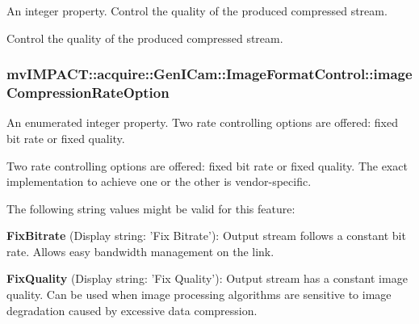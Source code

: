 An integer property. Control the quality of the produced compressed stream. 

Control the quality of the produced compressed stream. \hypertarget{classmv_i_m_p_a_c_t_1_1acquire_1_1_gen_i_cam_1_1_image_format_control_a22653a4407894a6665295887050343a2}{
\subsubsection[{image\+Compression\+Rate\+Option}]{ mv\+I\+M\+P\+A\+C\+T\+::acquire\+::\+Gen\+I\+Cam\+::\+Image\+Format\+Control\+::image\+Compression\+Rate\+Option}}\label{classmv_i_m_p_a_c_t_1_1acquire_1_1_gen_i_cam_1_1_image_format_control_a22653a4407894a6665295887050343a2}


An enumerated integer property. Two rate controlling options are offered\+: fixed bit rate or fixed quality. 

Two rate controlling options are offered\+: fixed bit rate or fixed quality. The exact implementation to achieve one or the other is vendor-\/specific.

The following string values might be valid for this feature\+:
\begin{DoxyItemize}
\item {\bfseries Fix\+Bitrate} (Display string\+: 'Fix Bitrate')\+: Output stream follows a constant bit rate. Allows easy bandwidth management on the link.
\item {\bfseries Fix\+Quality} (Display string\+: 'Fix Quality')\+: Output stream has a constant image quality. Can be used when image processing algorithms are sensitive to image degradation caused by excessive data compression.
\end{DoxyItemize}

